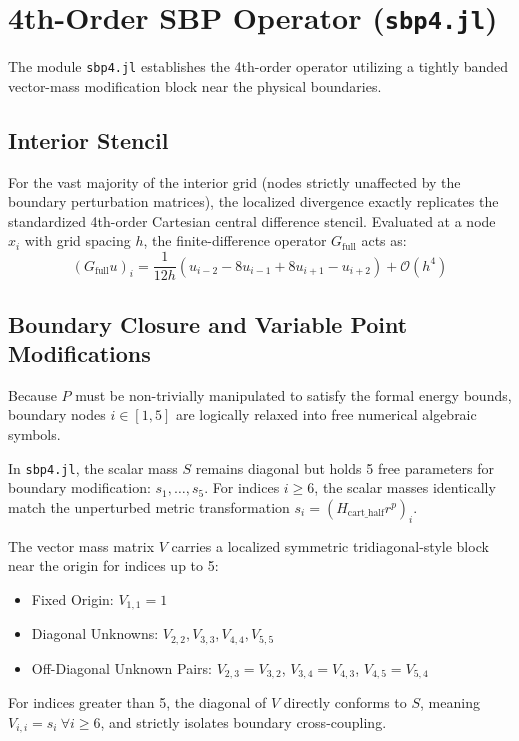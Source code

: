 \documentclass[reprint,amsmath,amssymb,aps]{revtex4-2}
\begin{document}
\section{4th-Order SBP Operator (\texttt{sbp4.jl})}

The module \texttt{sbp4.jl} establishes the 4th-order operator utilizing a tightly banded vector-mass modification block near the physical boundaries.

\subsection{Interior Stencil}
For the vast majority of the interior grid (nodes strictly unaffected by the boundary perturbation matrices), the localized divergence exactly replicates the standardized 4th-order Cartesian central difference stencil. Evaluated at a node $x_i$ with grid spacing $h$, the finite-difference operator $G_{\text{full}}$ acts as:
\begin{equation}
    (G_{\text{full}} u)_i = \frac{1}{12h} \left( u_{i-2} - 8u_{i-1} + 8u_{i+1} - u_{i+2} \right) + \mathcal{O}(h^4)
\end{equation}

\subsection{Boundary Closure and Variable Point Modifications}
Because $P$ must be non-trivially manipulated to satisfy the formal energy bounds, boundary nodes $i \in [1, 5]$ are logically relaxed into free numerical algebraic symbols. 

In \texttt{sbp4.jl}, the scalar mass $S$ remains diagonal but holds 5 free parameters for boundary modification: $s_1, \dots, s_5$. For indices $i \ge 6$, the scalar masses identically match the unperturbed metric transformation $s_i = (H_{\text{cart\_half}} r^p)_i$.

The vector mass matrix $V$ carries a localized symmetric tridiagonal-style block near the origin for indices up to 5:
\begin{itemize}
    \item Fixed Origin: $V_{1,1} = 1$
    \item Diagonal Unknowns: $V_{2,2}, V_{3,3}, V_{4,4}, V_{5,5}$
    \item Off-Diagonal Unknown Pairs: $V_{2,3}=V_{3,2}$, $V_{3,4}=V_{4,3}$, $V_{4,5}=V_{5,4}$
\end{itemize}
For indices greater than 5, the diagonal of $V$ directly conforms to $S$, meaning $V_{i,i} = s_i \ \forall i \ge 6$, and strictly isolates boundary cross-coupling.
\end{document}
